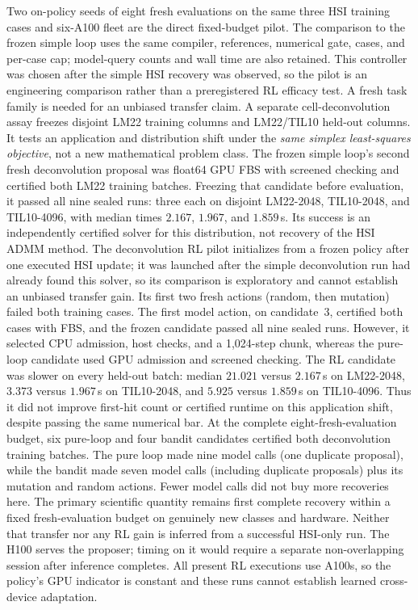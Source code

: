 Two on-policy seeds of eight fresh evaluations on the same three HSI training
cases and six-A100 fleet are the direct fixed-budget pilot. The comparison to
the frozen simple loop uses the same compiler, references, numerical gate,
cases, and per-case cap; model-query counts and wall time are also retained.
This controller was chosen after the simple HSI recovery was observed, so the
pilot is an engineering comparison rather than a preregistered RL efficacy
test. A fresh task family is needed for an unbiased transfer claim.
A separate cell-deconvolution assay freezes disjoint LM22 training columns and
LM22/TIL10 held-out columns. It tests an application and distribution shift
under the \emph{same simplex least-squares objective}, not a new mathematical
problem class. The frozen simple loop's second fresh deconvolution proposal
was float64 GPU FBS with screened checking and certified both LM22 training
batches. Freezing that candidate before evaluation, it passed all nine sealed
runs: three each on disjoint LM22-2048, TIL10-2048, and TIL10-4096, with
median times $2.167$, $1.967$, and $1.859$\,s. Its success is an independently
certified solver for this distribution, not recovery of the HSI ADMM method.
The deconvolution RL pilot initializes from a frozen policy after one executed
HSI update; it was launched after the simple deconvolution run had already
found this solver, so its comparison is exploratory and cannot establish an
unbiased transfer gain. Its first two fresh actions (random, then mutation)
failed both training cases. The first model action, on candidate~3, certified
both cases with FBS, and the frozen candidate passed all nine sealed runs.
However, it selected CPU admission, host checks, and a 1,024-step chunk,
whereas the pure-loop candidate used GPU admission and screened checking.
The RL candidate was slower on every held-out batch: median $21.021$ versus
$2.167$\,s on LM22-2048, $3.373$ versus $1.967$\,s on TIL10-2048, and
$5.925$ versus $1.859$\,s on TIL10-4096. Thus it did not improve first-hit
count or certified runtime on this application shift, despite passing the same
numerical bar. At the complete eight-fresh-evaluation budget, six pure-loop
and four bandit candidates certified both deconvolution training batches.
The pure loop made nine model calls (one duplicate proposal), while the bandit
made seven model calls (including duplicate proposals) plus its mutation and
random actions. Fewer model calls did not buy more recoveries here.
The primary scientific quantity remains first complete recovery
within a fixed fresh-evaluation budget on genuinely new classes and hardware.
Neither that transfer nor any RL gain is inferred from a successful HSI-only
run. The H100 serves the proposer; timing on it would require a separate
non-overlapping session after inference completes. All present RL executions
use A100s, so the policy's GPU indicator is constant and these runs cannot
establish learned cross-device adaptation.

